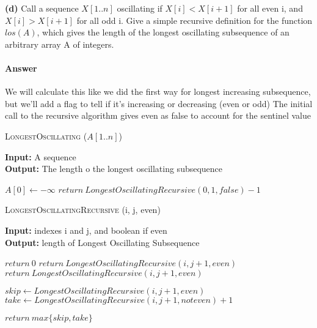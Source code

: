 \documentclass{article}
\begin{document}
{\bf (d)} Call a sequence $X[1.. n]$ oscillating if $X[i] < X[i + 1]$ for all even i, and
$X[i] > X[i + 1]$ for all odd i. Give a simple recursive definition for
the function $los(A)$, which gives the length of the longest oscillating
subsequence of an arbitrary array A of integers.

\paragraph{Answer}

We will calculate this like we did the first way for longest increasing subsequence, but we'll add a
flag to tell if it's increasing or decreasing (even or odd)
The initial call to the recursive algorithm gives even as false to account for the sentinel value

\begin{algorithm} \caption{\textsc{LongestOscillating} ($A[1..n]$)}\label{alg:seb}
    {\bf Input:} A sequence\\
    {\bf Output:} The length o the longest oscillating subsequence
    \begin{algorithmic}[1]
        \State$A[0] \gets - \infty$
        \State$return\ LongestOscillatingRecursive(0, 1, false) -1$
    \end{algorithmic}
\end{algorithm}

\begin{algorithm} \caption{\textsc{LongestOscillatingRecursive} (i, j, even)}\label{alg:seb}
    {\bf Input:} indexes i and j, and boolean if even\\
    {\bf Output:} length of Longest Oscillating Subsequence
    \begin{algorithmic}[1]
            \State$return\ 0$
                \State$return\ LongestOscillatingRecursive(i, j+1, even)$
            \EndIf{}
        \Else{}
                \State$return\ LongestOscillatingRecursive(i, j+1, even)$
            \EndIf{}
        \EndIf{}

        \State$skip \gets LongestOscillatingRecursive(i, j+1, even)$
        \State$take \gets LongestOscillatingRecursive(i, j+1, not even) +1$

        \State$return\ max\{skip, take\}$
    \end{algorithmic}
\end{algorithm}

\todo{}
\end{document}
